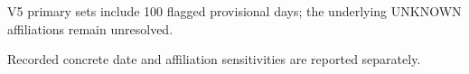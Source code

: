 \begin{table}[htbp]
\begin{minipage}{0.98\linewidth}
\par{\footnotesize V5 primary sets include 100 flagged provisional days; the underlying UNKNOWN affiliations remain unresolved.}\par{\footnotesize Recorded concrete date and affiliation sensitivities are reported separately.}
\end{minipage}
\end{table}
